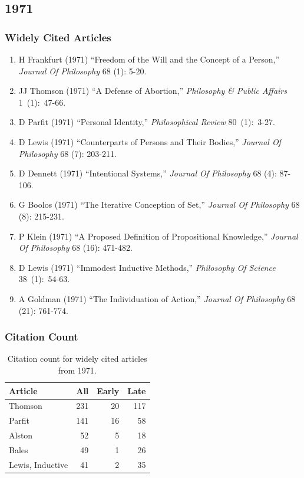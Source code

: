 \documentclass[
  10pt,
  letterpaper,
  DIV=11,
  numbers=noendperiod,
  twoside]{scrartcl}
\providecommand{\tightlist}{%
  \setlength{\itemsep}{0pt}\setlength{\parskip}{0pt}}\usepackage{longtable,booktabs,array}
\begin{document}
\newpage

\subsection{1971}\label{sec-s1971}

\subsubsection*{Widely Cited Articles}\label{widely-cited-articles-14}

\begin{enumerate}
\def\labelenumi{\arabic{enumi}.}
\tightlist
\item
  H Frankfurt (1971) ``Freedom of the Will and the Concept of a
  Person,'' \emph{Journal Of Philosophy} 68 (1): 5-20.
\item
  JJ Thomson (1971) ``A Defense of Abortion,'' \emph{Philosophy \&
  Public Affairs} 1~(1):~47-66.
\item
  D Parfit (1971) ``Personal Identity,'' \emph{Philosophical Review}
  80~(1):~3-27.
\item
  D Lewis (1971) ``Counterparts of Persons and Their Bodies,''
  \emph{Journal Of Philosophy} 68 (7): 203-211.
\item
  D Dennett (1971) ``Intentional Systems,'' \emph{Journal Of Philosophy}
  68 (4): 87-106.
\item
  G Boolos (1971) ``The Iterative Conception of Set,'' \emph{Journal Of
  Philosophy} 68 (8): 215-231.
\item
  P Klein (1971) ``A Proposed Definition of Propositional Knowledge,''
  \emph{Journal Of Philosophy} 68 (16): 471-482.
\item
  D Lewis (1971) ``Immodest Inductive Methods,'' \emph{Philosophy Of
  Science} 38~(1):~54-63.
\item
  A Goldman (1971) ``The Individuation of Action,'' \emph{Journal Of
  Philosophy} 68 (21): 761-774.
\end{enumerate}

\subsubsection*{Citation Count}\label{sec-count-1971}

\begin{longtable}[]{@{}lrrr@{}}

\caption{\label{tbl-citation-count-1971}Citation count for widely cited
articles from 1971.}

\tabularnewline

\toprule\noalign{}
Article & All & Early & Late \\
\midrule\noalign{}
\endhead
\bottomrule\noalign{}
\endlastfoot
Thomson & 231 & 20 & 117 \\
Parfit & 141 & 16 & 58 \\
Alston & 52 & 5 & 18 \\
Bales & 49 & 1 & 26 \\
Lewis, Inductive & 41 & 2 & 35 \\

\end{longtable}
\end{document}
